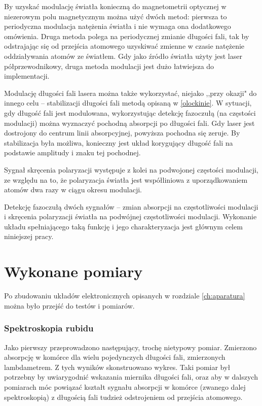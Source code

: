 \documentclass[a4paper,10pt]{article}
\begin{document}
By uzyskać modulację światła konieczną do magnetometrii optycznej w niezerowym polu magnetycznym można użyć dwóch metod: pierwsza to periodyczna modulacja natężenia światła i nie wymaga ona dodatkowego omówienia. Druga metoda polega na periodycznej zmianie długości fali, tak by odstrajając się od przejścia atomowego uzyskiwać zmienne w czasie natężenie oddziaływania atomów ze światłem. Gdy jako źródło światła użyty jest laser półprzewodnikowy, druga metoda modulacji jest dużo łatwiejsza do implementacji.

Modulację długości fali lasera można także wykorzystać, niejako  ,,przy okazji" do innego celu -- stabilizacji długości fali metodą opisaną w \ref{olockinie}. W sytuacji, gdy długość fali jest modulowana, wykorzystując detekcję fazoczułą (na częstości modulacji) można wyznaczyć pochodną absorpcji po długości fali.
Gdy laser jest dostrojony do centrum linii absorpcyjnej, powyższa pochodna się zeruje. By stabilizacja była możliwa, konieczny jest układ korygujący długość fali na podstawie amplitudy i znaku tej pochodnej.

Sygnał skręcenia polaryzacji występuje z kolei na podwojonej częstości modulacji, ze względu na to, że polaryzacja światła jest współliniowa z uporządkowaniem atomów dwa razy w ciągu okresu modulacji.

Detekcję fazoczułą dwóch sygnałów -- zmian absorpcji na częstotliwości modulacji i skręcenia polaryzacji światła na podwójnej częstotliwości modulacji. Wykonanie układu spełniającego taką funkcję i jego charakteryzacja jest głównym celem niniejszej pracy.



\pagebreak


\chapter{Wykonane pomiary}

Po zbudowaniu układów elektronicznych opisanych w rozdziale \ref{ch:aparatura} można było przejść do testów i pomiarów.




\subsection{Spektroskopia rubidu}

Jako pierwszy przeprowadzono następujący, trochę nietypowy pomiar.
Zmierzono absorpcję w komórce dla wielu pojedynczych długości fali, zmierzonych lambdametrem. Z tych wyników skonstruowano wykres.
Taki pomiar był potrzebny by uwiarygodnić wskazania miernika długości fali, oraz aby w dalszych pomiarach móc powiązać kształt sygnału absorpcji w komórce (zwanego dalej spektroskopią) z długością fali tudzież odstrojeniem od przejścia atomowego.
 
\end{document}
